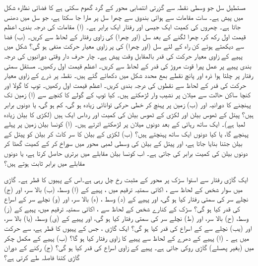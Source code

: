 مستطیل سل جو وسطی نقطہ  سے گزرتی انتصابی محور کے گرد گھوم سکتی ہے کا فضائی نظارہ شکل  میں پیش ہے۔ سات مقامات سے ہوائی بندوق سے  چھرا  سل پر مارا جا سکتا ہے، جو سل میں دھنس جاتا ہے۔ چھروں کی کمیت ایک جیسی اور رفتار ایک برابر ہے۔ (ا)   مقامات کی درجہ بندی، اعظم  قیمت اول رکھ کر،   چھرا لگنے کے بعد سل (اور  چھرا)  کی زاوی رفتار  کے لحاظ سے کریں۔ (ب)  فضا سے  دیکھتے ہوئے  کن راہ  کے لئے سل (اور چھرا) کی      پر زاوی معیار حرکت  منفی ہو گی؟
شکل  میں پہیے  کے زاوی معیار حرکت کی قدر  بالمقابل وقت  پیش ہے۔ چار  حرف دار وقتی دورانیوں  کی درجہ بندی پہیے پر  عمل پیرا   قوت مروڑ کی قدر کے لحاظ سے کریں۔ اعظم قیمت اول رکھیں۔
مستقل سمتی رفتار  پر چلتا ہوا ذرہ اور پانچ نقطے  بمع   محدد شکل  میں دکھائے گئے ہیں۔ نقطہ پر ذرے  کے زاوی معیار حرکت کی قدر  کے لحاظ سے نقطوں کی درجہ بندی کریں۔ اعظم قیمت اول رکھیں۔
توپ کا گولا اور کنچا ساکن حالت سے میلان پر نشیب وار  لڑھکتے ہیں۔ کیا توپ کے  گولے کا  کنچے سے (ا) زمین تک پہنچنے کا دورانیہ اور (ب)  زمین پر پہنچ کر خطی حرکی توانائی   زیادہ ہو گی، کم ہو گی، یا  دونوں  برابر ہیں؟
  پیتل کے ٹھوس بیلن  اور لکڑی کے ٹھوس بیلن کی کمیت اور رداس ایک ہیں (لکڑی  کا بیلن زیادہ لمبا ہے)۔  ایک ساتھ رہائی کے بعد دونوں  میلان پر  لڑھکتے اترتے ہیں۔ (ا)  کونسا بیلن زمین پر پہلے پہنچے گا، یا  کیا دونوں ایک ساتھ پہنچتے ہیں؟ (ب)  لکڑی کے بیلن کا سر   کاٹ کر بیلن کو پیتل کے بیلن جتنا    بنایا جاتا ہے، اور پیتل کے بیلن  کی  وسطی لمبی محور  میں سوراخ کر کے کمیت گھٹا کر دونوں بیلن کی کمیت برابر کی جاتی ہے۔ اب کونسا بیلن مقابلے میں برتری حاصل کرتا ہے، یا دونوں مقابلے میں  برابر ثابت ہوتے ہیں؟

ایک گاڑی  رفتار سے   استوا سڑک  پر محور  کے مثبت رخ چل رہی ہے۔اس کے  پہیوں کا قطر  ہے۔ گاڑی میں سوار شخص کے لحاظ سے  ، اکائی سمتیہ ترقیم میں ، پہیے کے   (ا) وسط، (ب) بالا سر، اور (ج)  نچلے سر کی سمتی رفتار  کیا ہو گی، اور  پہیے کے  (د) وسط ، (ہ) بالا سر، اور (و) نچلے سر  کے اسراع کی قدر    کیا ہو گی؟ سڑک کے کنارے شخص کے لحاظ سے ، اکائی سمتیہ ترقیم میں،  پہیے کے    (ز)  وسط، (ح) بالا سر، اور (ط) نچلے سر کی سمتی رفتار  کیا ہو گی، اور پہیے کے (ی) وسط، (یا) بالا سر، اور (یب) نچلے سے کے اسراع کی قدر  کیا ہو گی؟
ایک گاڑی  ، جس کے پہیوں کا قطر  ہے،   سے حرکت میں ہے ۔ (ا) پہیے کے دھرے کے لحاظ سے پہیے کا زاوی رفتار کیا ہو گا؟ (ب)   پہیے کے  مکمل چکر میں (بغیر پھسلے)  گاڑی روکی جاتی ہے۔ پہیے کے زاوی اسراع کی قدر کیا ہو گی؟ (ج)  رکنے کے دوران گاڑی کتنا فاصلہ طے کرتی ہے؟

